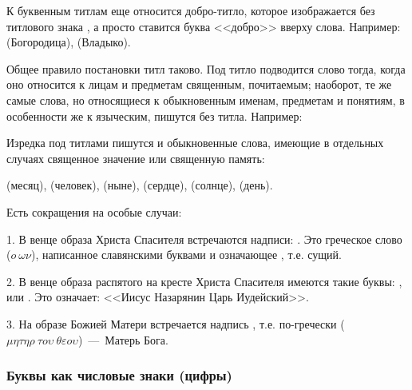 \documentclass[11pt,a4paper,oneside]{memoir}
\begin{document}
    К буквенным титлам еще относится добро-титло, которое изображается без титлового знака {}, а просто ставится буква <<добро>> вверху слова. Например: {} (Богородица), {} (Владыко).
    
    Общее правило постановки титл таково. Под титло подводится слово тогда, когда оно относится к лицам и предметам священным, почитаемым; наоборот, те же самые слова, но относящиеся к обыкновенным именам, предметам и понятиям, в особенности же к языческим, пишутся без титла. Например:

    \bigskip{}

    Изредка под титлами пишутся и обыкновенные слова, имеющие в отдельных случаях священное значение или священную память:
    
    {} (месяц), {} (человек), {} (ныне), {} (сердце), {} (солнце), {} (день).
    
    Есть сокращения на особые случаи:
    
    1. В венце образа Христа Спасителя встречаются надписи: {}. Это греческое слово ({$o~\omega\nu$}), написанное славянскими буквами и означающее {}, т.е. сущий.
    
    2. В венце образа распятого на кресте Христа Спасителя имеются такие буквы: {}, или {}. Это означает: <<Иисус Назарянин Царь Иудейский>>.
    
    3. На образе Божией Матери встречается надпись {}, т.е. по-гречески ({$\mu\eta\tau\eta\rho~\tau o \upsilon~\theta\varepsilon o \upsilon$})~---~Матерь Бога.
        
                \subsubsection{Буквы как числовые знаки (цифры)}
\end{document}
